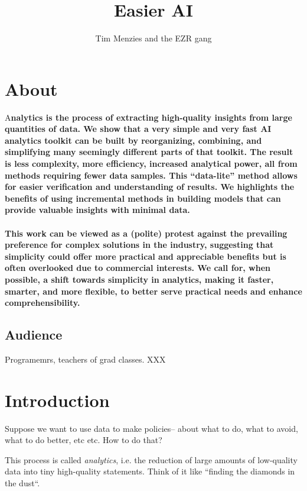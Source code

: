 \documentclass[landscape,	DIV=calc,%
							paper=letter,%
							fontsize=10pt,%
							twocolumn]{scrartcl}	 					%
\title{Easier AI }					%
\author{Tim Menzies and the EZR gang }											%
\date{}
\newcommand{\initial}[1]{%
     \lettrine[lines=3,lhang=0.3,nindent=0em]{
     				\color{DarkGoldenrod}
     				{\textsf{#1}}}{}}
\begin{document}
\maketitle
\section*{About}
\thispagestyle{fancy} 			%
\initial{A}\textbf{nalytics is the process of
extracting high-quality  insights from large quantities
of data. We show that a very
simple and very fast
AI analytics toolkit can  be built by reorganizing, combining, and simplifying
many seemingly different parts of that toolkit. The result is
less complexity, more efficiency, increased analytical
power, all from
methods requiring fewer data samples. This ``data-lite'' method
allows for easier verification and understanding of results. We
highlights the benefits of using incremental methods  in building
models that can provide valuable insights with minimal data.~\\~\\ 
This  work can be viewed as a (polite) protest
against  the prevailing preference for complex solutions
in the industry,  suggesting that simplicity could offer more
practical and appreciable benefits but is often overlooked due to
commercial interests. We call for, when possible,
a shift towards simplicity
in analytics, making it faster, smarter, and more flexible, to
better serve practical needs and enhance comprehensibility.}

\subsection*{Audience}
Programemrs, teachers of grad classes. XXX\newpage

\tableofcontents


\clearpage \section{Introduction}

Suppose we want to use data to make policies-- about what to do,
what to avoid, what to do better, etc etc. How to do that?

This process is called {\em analytics}, i.e. the reduction of large
amounts of low-quality data into tiny high-quality statements. Think of it like
``finding the diamonds in the dust``. 
\end{document}

